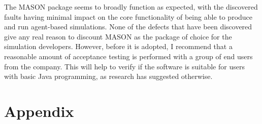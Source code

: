 \documentclass[11pt]{article}
\begin{document}
The MASON package seems to broadly function as expected, with the discovered faults having minimal impact on the core functionality of being able to produce and run agent-based simulations.
None of the defects that have been discovered give any real reason to discount MASON as the package of choice for the simulation developers.
However, before it is adopted, I recommend that a reasonable amount of acceptance testing is performed with a group of end users from the company.
This will help to verify if the software is suitable for users with basic Java programming, as research\cite{abm_platforms_review} has suggested otherwise.

\newpage
\raggedright
{}

\newpage
\section{Appendix}

\end{document}
